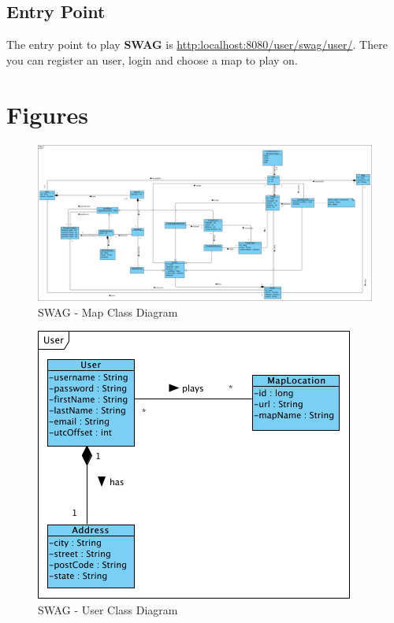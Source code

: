 \documentclass[11pt]{article}
\begin{document}
\subsection{Entry Point}

The entry point to play \textbf{SWAG} is \href{http:localhost:8080/user/swag/user/}{http:localhost:8080/user/swag/user/}. There you can register an user, login and choose a map to play on.

\newpage

\appendix
\section{Figures}

\begin{figure}[h]
\center
\includegraphics[angle=90, scale=0.3]{diagrams/map.png}
\caption{SWAG - Map Class Diagram}
\label{fig:map_cd}
\end{figure}

\begin{figure}[h]
\center
\includegraphics[scale=1]{diagrams/user.png}
\caption{SWAG - User Class Diagram}
\label{fig:user_cd}
\end{figure}
\end{document}
